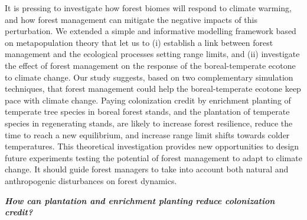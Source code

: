 \documentclass[12pt]{article}
\begin{document}
It is pressing to investigate how forest biomes will respond to climate
warming, and how forest management can mitigate the negative impacts of
this perturbation. We extended a simple and informative modelling
framework based on metapopulation theory that let us to (i) establish a
link between forest management and the ecological processes setting
range limits, and (ii) investigate the effect of forest management on
the response of the boreal-temperate ecotone to climate change. Our
study suggests, based on two complementary simulation techniques, that
forest management could help the boreal-temperate ecotone keep pace with
climate change. Paying colonization credit by enrichment planting of
temperate tree species in boreal forest stands, and the plantation of
temperate species in regenerating stands, are likely to increase forest
resilience, reduce the time to reach a new equilibrium, and increase
range limit shifts towards colder temperatures. This theoretical
investigation provides new opportunities to design future experiments
testing the potential of forest management to adapt to climate change.
It should guide forest managers to take into account both natural and
anthropogenic disturbances on forest dynamics.

\textbf{\emph{How can plantation and enrichment planting reduce
colonization credit?}}
\end{document}
